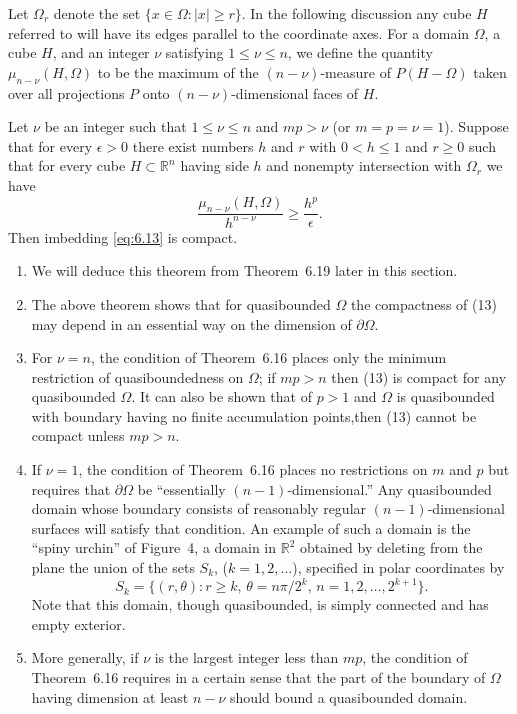 \begin{para}
  Let $\Omega_r$ denote the set $\{x\in\Omega: |x|\geq r\}$.
  In the following discussion any cube $H$ referred to will have its edges parallel
  to the coordinate axes. For a domain $\Omega$, a cube $H$, and an integer $\nu$
  satisfying $1\leq\nu\leq n$, we define the quantity $\mu_{n-\nu}(H,\Omega)$
  to be the maximum of the $(n-\nu)$-measure of $P(H-\Omega)$ taken over
  all projections $P$ onto $(n-\nu)$-dimensional faces of $H$.
\end{para}


\begin{theorem}
  Let $\nu$ be an integer such that $1\leq\nu\leq n$ and $mp>\nu$
  (or $m=p=\nu=1$). Suppose that for every $\epsilon>0$ there exist
  numbers $h$ and $r$ with $0<h\leq 1$ and $r\geq 0$ such that for every
  cube $H\subset \mathbb{R}^n$ having side $h$ and nonempty intersection
  with $\Omega_r$ we have
  \[\frac{\mu_{n-\nu}(H,\Omega)}{h^{n-\nu}} \geq \frac{h^p}{\epsilon}.\]
  Then imbedding \eqref{eq:6.13} is compact.
\end{theorem}


\begin{remarks}
  \begin{enumerate}
    \item We will deduce this theorem from Theorem~6.19 later in this section.
    \item The above theorem shows that for quasibounded $\Omega$ the compactness
      of (13) may depend in an essential way on the dimension of $\partial\Omega$.
    \item For $\nu = n$, the condition of Theorem~6.16 places only the minimum
      restriction of quasiboundedness on $\Omega$; if $mp>n$ then (13) is compact
      for any quasibounded $\Omega$. It can also be shown that of $p>1$ and $\Omega$
      is quasibounded with boundary having no finite accumulation points,then
      (13) cannot be compact unless $mp>n$.
    \item If $\nu=1$, the condition of Theorem~6.16 places no restrictions on $m$
      and $p$ but requires that $\partial\Omega$ be ``essentially $(n-1)$-dimensional.''
      Any quasibounded domain whose boundary consists of reasonably regular
      $(n-1)$-dimensional surfaces will satisfy that condition.
      An example of such a domain is the ``spiny urchin'' of Figure~4, a domain in $\mathbb{R}^2$
      obtained by deleting from the plane the union of the sets $S_k$, ($k=1,2,\ldots$),
      specified in polar coordinates by
      \[ S_k = \bigl\{(r,\theta): r\geq k,\,\theta = n\pi/2^k,\,n=1,2,\ldots,2^{k+1}\bigr\}. \]
      Note that this domain, though quasibounded, is simply connected and has empty exterior.
    \item More generally, if $\nu$ is the largest integer less than $mp$,
      the condition of Theorem~6.16 requires in a certain sense that the part of the
      boundary of $\Omega$ having dimension at least $n-\nu$ should bound a quasibounded domain.
  \end{enumerate}
\end{remarks}


